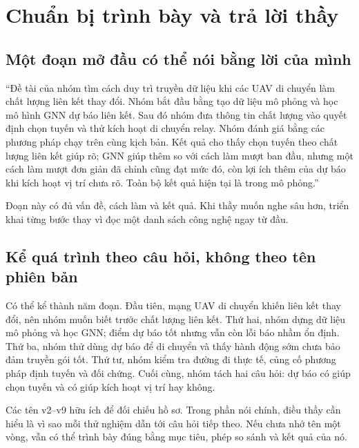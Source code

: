 \chapter{Chuẩn bị trình bày và trả lời thầy}
\section{Một đoạn mở đầu có thể nói bằng lời của mình}
``Đề tài của nhóm tìm cách duy trì truyền dữ liệu khi các UAV di chuyển làm chất lượng liên kết thay đổi. Nhóm bắt đầu bằng tạo dữ liệu mô phỏng và học mô hình GNN dự báo liên kết. Sau đó nhóm đưa thông tin chất lượng vào quyết định chọn tuyến và thử kích hoạt di chuyển relay. Nhóm đánh giá bằng các phương pháp chạy trên cùng kịch bản. Kết quả cho thấy chọn tuyến theo chất lượng liên kết giúp rõ; GNN giúp thêm so với cách làm mượt ban đầu, nhưng một cách làm mượt đơn giản đã chỉnh cũng đạt mức đó, còn lợi ích thêm của dự báo khi kích hoạt vị trí chưa rõ. Toàn bộ kết quả hiện tại là trong mô phỏng.''

Đoạn này có đủ vấn đề, cách làm và kết quả. Khi thầy muốn nghe sâu hơn, triển khai từng bước thay vì đọc một danh sách công nghệ ngay từ đầu.

\section{Kể quá trình theo câu hỏi, không theo tên phiên bản}
Có thể kể thành năm đoạn. Đầu tiên, mạng UAV di chuyển khiến liên kết thay đổi, nên nhóm muốn biết trước chất lượng liên kết. Thứ hai, nhóm dựng dữ liệu mô phỏng và học GNN; điểm dự báo tốt nhưng vẫn còn lỗi báo nhầm ổn định. Thứ ba, nhóm thử dùng dự báo để di chuyển và thấy hành động sớm chưa bảo đảm truyền gói tốt. Thứ tư, nhóm kiểm tra đường đi thực tế, củng cố phương pháp định tuyến và đối chứng. Cuối cùng, nhóm tách hai câu hỏi: dự báo có giúp chọn tuyến và có giúp kích hoạt vị trí hay không.

Các tên v2--v9 hữu ích để đối chiếu hồ sơ. Trong phần nói chính, điều thầy cần hiểu là vì sao mỗi thử nghiệm dẫn tới câu hỏi tiếp theo. Nếu chưa nhớ tên một vòng, vẫn có thể trình bày đúng bằng mục tiêu, phép so sánh và kết quả của nó.

